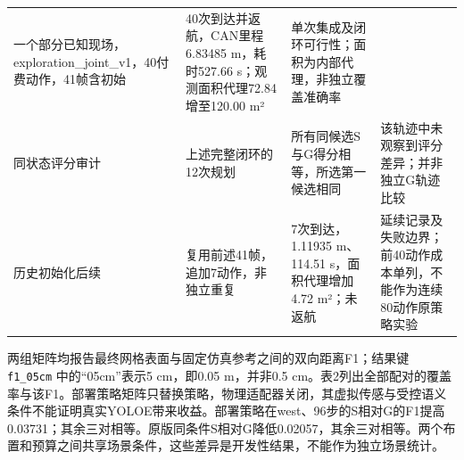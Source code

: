 \documentclass[]{article}
\begin{document}
\begin{longtable}[]{@{}llll@{}}
\begin{minipage}[t]{0.22\columnwidth}
一个部分已知现场，exploration\_joint\_v1，40付费动作，41帧含初始\strut
\end{minipage} & \begin{minipage}[t]{0.22\columnwidth}\raggedright
40次到达并返航，CAN里程6.83485 m，耗时527.66
s；观测面积代理72.84增至120.00 m²\strut
\end{minipage} & \begin{minipage}[t]{0.22\columnwidth}\raggedright
单次集成及闭环可行性；面积为内部代理，非独立覆盖准确率\strut
\end{minipage}\tabularnewline
\begin{minipage}[t]{0.22\columnwidth}\raggedright
同状态评分审计\strut
\end{minipage} & \begin{minipage}[t]{0.22\columnwidth}\raggedright
上述完整闭环的12次规划\strut
\end{minipage} & \begin{minipage}[t]{0.22\columnwidth}\raggedright
所有同候选S与G得分相等，所选第一候选相同\strut
\end{minipage} & \begin{minipage}[t]{0.22\columnwidth}\raggedright
该轨迹中未观察到评分差异；并非独立G轨迹比较\strut
\end{minipage}\tabularnewline
\begin{minipage}[t]{0.22\columnwidth}\raggedright
历史初始化后续\strut
\end{minipage} & \begin{minipage}[t]{0.22\columnwidth}\raggedright
复用前述41帧，追加7动作，非独立重复\strut
\end{minipage} & \begin{minipage}[t]{0.22\columnwidth}\raggedright
7次到达，1.11935 m、114.51 s，面积代理增加4.72 m²；未返航\strut
\end{minipage} & \begin{minipage}[t]{0.22\columnwidth}\raggedright
延续记录及失败边界；前40动作成本单列，不能作为连续80动作原策略实验\strut
\end{minipage}\tabularnewline
\bottomrule
\end{longtable}

两组矩阵均报告最终网格表面与固定仿真参考之间的双向距离F1；结果键
\texttt{f1\_05cm} 中的``05cm''表示5 cm，即0.05 m，并非0.5
cm。表2列出全部配对的覆盖率与该F1。部署策略矩阵只替换策略，物理适配器关闭，其虚拟传感与受控语义条件不能证明真实YOLOE带来收益。部署策略在west、96步的S相对G的F1提高0.03731；其余三对相等。原版同条件S相对G降低0.02057，其余三对相等。两个布置和预算之间共享场景条件，这些差异是开发性结果，不能作为独立场景统计。
\end{document}
